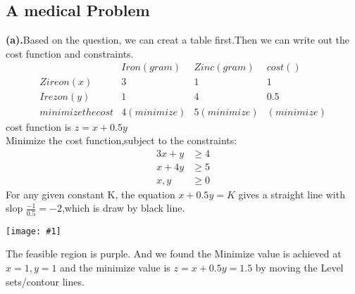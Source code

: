 \documentclass[11pt]{article}
\newcommand{\simplot}[1]{\begin{center}
  \texttt{[image: \#1]}
\end{center}}
\begin{document}
\subsection{A medical Problem}
\textbf{(a).}Based on the question, we can creat a table first.Then we can write out the cost function and constraints.
\[
\begin{array}{c|c|c|c}
&Iron(gram)&Zinc(gram)&cost()\\\hline
Zireon(x)&3&1&1\\\hline
Irezon(y)&1&4&0.5\\\hline
minimize the cost&4(minimize)&5(minimize)&(minimize)
\end{array}
\]
cost function is $z=x+0.5y$\\
Minimize the cost function,subject to the constraints:\\
\begin{align*}
    3x+y&\geq 4\\
    x+4y&\geq 5\\
    x,y&\geq 0
\end{align*}
For any given constant K, the equation $x+0.5y=K$ gives a straight line with slop $\frac{-1}{0.5}=-2$,which is draw by black line.
\simplot{484-hw1.3.jpg}
The feasible region is purple. And we found the Minimize value is achieved at $x=1,y=1$ and the minimize value
is $z=x+0.5y=1.5$ by moving the Level sets/contour lines.
\newpage
\end{document}
